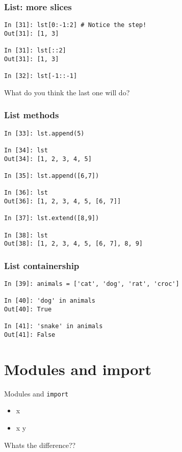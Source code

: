 \documentclass[14pt,compress]{beamer}
\newcounter{time}
\newcommand{\inctime}[1]{\addtocounter{time}{#1}{\tiny \thetime\ m}}
\newcommand{\typ}[1]{\texttt{#1}}
\newcommand{\kwrd}[1]{ \texttt{\textbf{\color{blue}{#1}}}  }
\begin{document}
\begin{frame}[fragile]
  \frametitle{List: more slices}
\begin{lstlisting}
In [31]: lst[0:-1:2] # Notice the step!
Out[31]: [1, 3]

In [31]: lst[::2]
Out[31]: [1, 3]

In [32]: lst[-1::-1]
\end{lstlisting}
What do you think the last one will do?
\end{frame}

\begin{frame}[fragile]
  \frametitle{List methods}
\begin{lstlisting}
In [33]: lst.append(5)

In [34]: lst
Out[34]: [1, 2, 3, 4, 5]

In [35]: lst.append([6,7])

In [36]: lst
Out[36]: [1, 2, 3, 4, 5, [6, 7]]

In [37]: lst.extend([8,9])

In [38]: lst
Out[38]: [1, 2, 3, 4, 5, [6, 7], 8, 9]
\end{lstlisting}
\end{frame}

\begin{frame}[fragile]
  \frametitle{List containership}
  \begin{lstlisting}
In [39]: animals = ['cat', 'dog', 'rat', 'croc']

In [40]: 'dog' in animals
Out[40]: True

In [41]: 'snake' in animals
Out[41]: False
  \end{lstlisting}
  \inctime{10}
\end{frame}

\section{Modules and import}
\begin{frame}{Modules and \typ{import}}
  \begin{itemize}
    \item \kwrd{import} x
    \item \kwrd{from} x \kwrd{import} y
  \end{itemize}
Whats the difference??
\inctime{5}
\end{frame}
\end{document}
